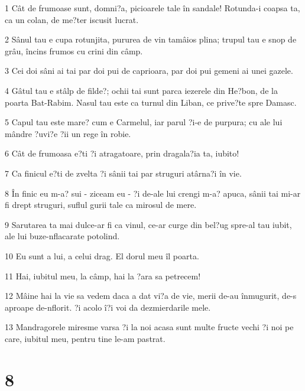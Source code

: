 \par 1 Cât de frumoase sunt, domni?a, picioarele tale în sandale! Rotunda-i coapsa ta, ca un colan, de me?ter iscusit lucrat.
\par 2 Sânul tau e cupa rotunjita, pururea de vin tamâios plina; trupul tau e snop de grâu, încins frumos cu crini din câmp.
\par 3 Cei doi sâni ai tai par doi pui de caprioara, par doi pui gemeni ai unei gazele.
\par 4 Gâtul tau e stâlp de filde?; ochii tai sunt parca iezerele din He?bon, de la poarta Bat-Rabim. Nasul tau este ca turnul din Liban, ce prive?te spre Damasc.
\par 5 Capul tau este mare? cum e Carmelul, iar parul ?i-e de purpura; cu ale lui mândre ?uvi?e ?ii un rege în robie.
\par 6 Cât de frumoasa e?ti ?i atragatoare, prin dragala?ia ta, iubito!
\par 7 Ca finicul e?ti de zvelta ?i sânii tai par struguri atârna?i în vie.
\par 8 În finic eu m-a? sui - ziceam eu - ?i de-ale lui crengi m-a? apuca, sânii tai mi-ar fi drept struguri, suflul gurii tale ca mirosul de mere.
\par 9 Sarutarea ta mai dulce-ar fi ca vinul, ce-ar curge din bel?ug spre-al tau iubit, ale lui buze-nflacarate potolind.
\par 10 Eu sunt a lui, a celui drag. El dorul meu îl poarta.
\par 11 Hai, iubitul meu, la câmp, hai la ?ara sa petrecem!
\par 12 Mâine hai la vie sa vedem daca a dat vi?a de vie, merii de-au înmugurit, de-s aproape de-nflorit. ?i acolo î?i voi da dezmierdarile mele.
\par 13 Mandragorele miresme varsa ?i la noi acasa sunt multe fructe vechi ?i noi pe care, iubitul meu, pentru tine le-am pastrat.

\chapter{8}

